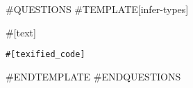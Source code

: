 \documentclass[a4paper]{article}
\newenvironment{exercise}{
  \begin{framed}}{
  \end{framed}}
\begin{document}
#QUESTIONS
#TEMPLATE[infer-types]
\begin{exercise}
\noindent #[text]
\begin{lstlisting}[language=MyJava]
#[texified_code]
\end{lstlisting}
\end{exercise}
\clearpage
#ENDTEMPLATE
#ENDQUESTIONS
\end{document}
